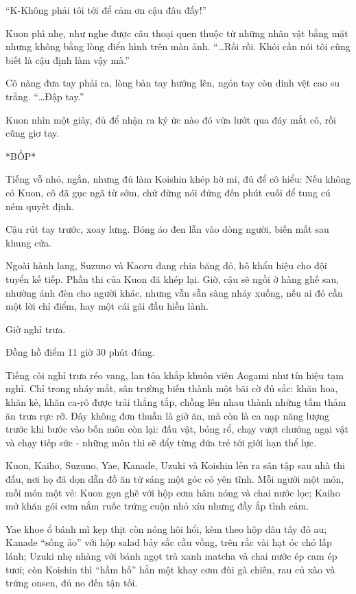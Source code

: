 \documentclass[../main.tex]{subfiles}
\begin{document}
``K-Không phải tôi tới để cảm ơn cậu đâu đấy!''

Kuon phì nhẹ, như nghe được câu thoại quen thuộc từ những nhân vật bằng mặt nhưng không bằng lòng điển hình trên màn ảnh. ``\dots Rồi rồi. Khỏi cần nói tôi cũng biết là cậu định làm vậy mà.''

Cô nàng đưa tay phải ra, lòng bàn tay hướng lên, ngón tay còn dính vệt cao su trắng. ``\dots Đập tay.''

Kuon nhìn một giây, đủ để nhận ra ký ức nào đó vừa lướt qua đáy mắt cô, rồi cũng giơ tay.

*BỐP*

Tiếng vỗ nhỏ, ngắn, nhưng đủ làm Koishin khép hờ mi, đủ để cô hiểu: Nếu không có Kuon, cô đã gục ngã từ sớm, chứ đừng nói đứng đến phút cuối để tung cú ném quyết định.

Cậu rút tay trước, xoay lưng. Bóng áo đen lẫn vào dòng người, biến mất sau khung cửa.

Ngoài hành lang, Suzuno và Kaoru đang chia băng đỏ, hô khẩu hiệu cho đội tuyển kế tiếp. Phần thi của Kuon đã khép lại. Giờ, cậu sẽ ngồi ở hàng ghế sau, nhường ánh đèn cho người khác, nhưng vẫn sẵn sàng nhảy xuống, nếu ai đó cần một lời chỉ điểm, hay một cái gãi đầu hiền lành.

\begin{center}
  {\color{vol} Giờ nghỉ trưa.}
\end{center}

Đồng hồ điểm 11 giờ 30 phút đúng.

Tiếng còi nghỉ trưa réo vang, lan tỏa khắp khuôn viên Aogami như tín hiệu tạm nghỉ. Chỉ trong nháy mắt, sân trường biến thành một bãi cờ đủ sắc: khăn hoa, khăn kẻ, khăn ca-rô được trải thẳng tắp, chồng lên nhau thành những tấm thảm ăn trưa rực rỡ. Đây không đơn thuần là giờ ăn, mà còn là ca nạp năng lượng trước khi bước vào bốn môn còn lại: đấu vật, bóng rổ, chạy vượt chướng ngại vật và chạy tiếp sức - những môn thi sẽ đẩy từng đứa trẻ tới giới hạn thể lực.

Kuon, Kaiho, Suzuno, Yae, Kanade, Uzuki và Koishin lẻn ra sân tập sau nhà thi đấu, nơi họ đã dọn dẵn đồ ăn từ sáng một góc cỏ yên tĩnh. Mỗi người một món, mỗi món một vẻ: Kuon gọn ghẽ với hộp cơm hâm nóng và chai nước lọc; Kaiho mở khăn gói cơm nắm ruốc trứng cuộn nhỏ xíu nhưng đầy ắp tình cảm.

Yae khoe ổ bánh mì kẹp thịt còn nóng hôi hổi, kèm theo hộp dâu tây đỏ au; Kanade ``sống ảo'' với hộp salad bảy sắc cầu vồng, trên rắc vài hạt óc chó lấp lánh; Uzuki nhẹ nhàng với bánh ngọt trà xanh matcha và chai nước ép cam ép tươi; còn Koishin thì ``hầm hố'' hẳn một khay cơm đùi gà chiên, rau củ xào và trứng onsen, đủ no đến tận tối.
\end{document}
